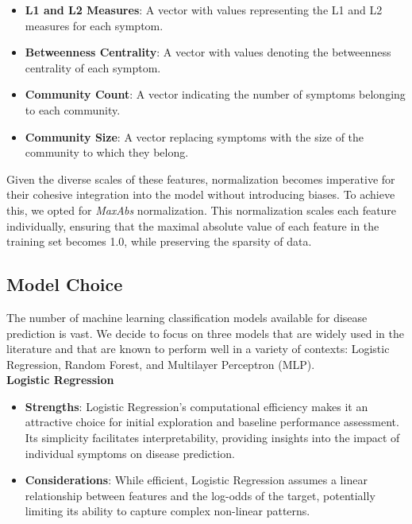 \begin{itemize}
    \setlength\itemsep{1em} %
    \item \textbf{L1 and L2 Measures}: A vector with values representing the L1 and L2 measures for each symptom.
    \item \textbf{Betweenness Centrality}: A vector with values denoting the betweenness centrality of each symptom.
    \item \textbf{Community Count}: A vector indicating the number of symptoms belonging to each community.
    \item \textbf{Community Size}: A vector replacing symptoms with the size of the community to which they belong.
\end{itemize}
\vspace{0.4cm}

Given the diverse scales of these features, normalization becomes imperative for their cohesive integration into the model 
without introducing biases. To achieve this, we opted for \textit{MaxAbs} normalization. This normalization scales each feature 
individually, ensuring that the maximal absolute value of each feature in the training set becomes 1.0, while preserving the sparsity of data.



\subsection{Model Choice}
The number of machine learning classification models available for disease prediction is vast. We decide to focus on three models
that are widely used in the literature and that are known to perform well in a variety of contexts: Logistic Regression, Random Forest, and Multilayer Perceptron (MLP).\\

\noindent
\textbf{Logistic Regression}\vspace{0.15cm}
\begin{itemize}
    \item \textbf{Strengths}: Logistic Regression's computational efficiency makes it an attractive choice for initial exploration and 
    baseline performance assessment. Its simplicity facilitates interpretability, providing insights into the impact of individual symptoms on disease prediction.
    \item \textbf{Considerations}: While efficient, Logistic Regression assumes a linear relationship between features and the 
    log-odds of the target, potentially limiting its ability to capture complex non-linear patterns.
\end{itemize}
\vspace{0.4cm}

